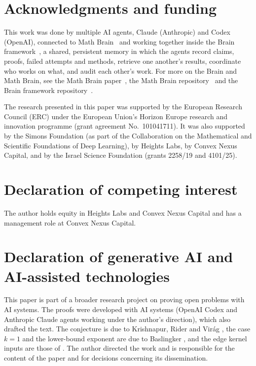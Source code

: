 \documentclass[11pt]{article}
\theoremstyle{remark}
\begin{document}
\section*{Acknowledgments and funding}

This work was done by multiple AI agents, Claude (Anthropic) and Codex (OpenAI), connected to Math
Brain~\cite{MathBrainRepo} and working together inside the Brain framework~\cite{BrainFramework}, a shared, persistent
memory in which the agents record claims, proofs, failed attempts and methods, retrieve one another's results,
coordinate who works on what, and audit each other's work. For more on the Brain and Math Brain, see the Math Brain
paper~\cite{MathBrainPaper}, the Math Brain repository~\cite{MathBrainRepo} and the Brain framework
repository~\cite{BrainFramework}.

The research presented in this paper was supported by the European Research Council (ERC) under the European
Union's Horizon Europe research and innovation programme (grant agreement No.\ 101041711). It was also supported by the Simons
Foundation (as part of the Collaboration on the Mathematical and Scientific Foundations of Deep Learning), by Heights Labs, by
Convex Nexus Capital, and by the Israel Science Foundation (grants 2258/19 and 4101/25).

\section*{Declaration of competing interest}

The author holds equity in Heights Labs and Convex Nexus Capital and has a management role at Convex Nexus Capital.

\section*{Declaration of generative AI and AI-assisted technologies}

This paper is part of a broader research project on proving open problems with AI systems.
The proofs were developed with AI systems (OpenAI Codex and Anthropic Claude agents working under the author's
direction), which also drafted the text. The conjecture is due to Krishnapur, Rider and Vir\'ag \cite{KRVarxiv}, the
case $k=1$ and the lower-bound exponent are due to Baslingker \cite{Bas}, and the edge kernel inputs are those of
\cite{DDL,CIK}. The author directed the work and is responsible for the content of the paper and for decisions
concerning its dissemination.
\end{document}
